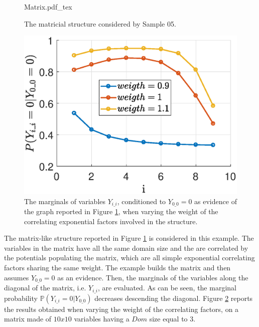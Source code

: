 \begin{figure}
	\centering
\def\svgwidth{0.55 \textwidth}
{Matrix.pdf_tex} 
\caption{The matricial structure considered by Sample 05.}
\label{fig:sample_04:1}
\end{figure}

\begin{figure}
	\centering
\includegraphics[width=0.48\columnwidth]{../src/Chapter_additional/03_Samples/image_04_05/Matrix_marginals.eps}
\caption{The marginals of variables $Y_{i\_i}$, conditioned to $Y_{0\_0}= 0$ as evidence of the graph reported in Figure \ref{fig:sample_04:1}, when varying the weight of the correlating exponential factors involved in the structure.}
\label{fig:sample_04:2}
\end{figure} 

The matrix-like structure reported in Figure \ref{fig:sample_04:1} is considered in this example. The variables in the matrix have all the same domain size and the are correlated by the potentials populating the matrix, which are all simple exponential correlating factors sharing the same weight.
The example builds the matrix and then assumes $Y_{0\_0} = 0$ as an evidence. Then, the marginals of the variables along the diagonal of the matrix, i.e. $Y_{i\_i}$, are evaluated. As can be seen, the marginal probability $\mathbb{P}(Y_{i\_i} = 0 | Y_{0\_0})$ decreases descending the diagonal. Figure \ref{fig:sample_04:2} reports the results obtained when varying the weight of the correlating factors, on a matrix made of $10x10$ variables having a $Dom$ size equal to $3$.